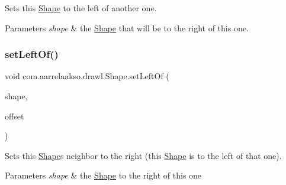 Sets this \hyperlink{classcom_1_1aarrelaakso_1_1drawl_1_1_shape}{Shape} to the left of another one. 


\begin{DoxyParams}{Parameters}
{\em shape} & the \hyperlink{classcom_1_1aarrelaakso_1_1drawl_1_1_shape}{Shape} that will be to the right of this one. \\
\hline
\end{DoxyParams}
\mbox{\label{classcom_1_1aarrelaakso_1_1drawl_1_1_shape_a185e0377ed1ba3ff4c8c630803f3bfc8}} 
\subsubsection{\texorpdfstring{set\+Left\+Of()}{setLeftOf()}\hspace{0.1cm}{\footnotesize\ttfamily [2/2]}}
{\footnotesize\ttfamily void com.\+aarrelaakso.\+drawl.\+Shape.\+set\+Left\+Of (\begin{DoxyParamCaption}\item[{@Not\+Null \hyperlink{classcom_1_1aarrelaakso_1_1drawl_1_1_shape}{Shape}}]{shape,  }\item[{@Not\+Null \hyperlink{classcom_1_1aarrelaakso_1_1drawl_1_1_measure}{Measure}}]{offset }\end{DoxyParamCaption})\hspace{0.3cm}{\ttfamily [inherited]}}



Sets this \hyperlink{classcom_1_1aarrelaakso_1_1drawl_1_1_shape}{Shape}\textquotesingle{}s neighbor to the right (this \hyperlink{classcom_1_1aarrelaakso_1_1drawl_1_1_shape}{Shape} is to the left of that one). 


\begin{DoxyParams}{Parameters}
{\em shape} & the \hyperlink{classcom_1_1aarrelaakso_1_1drawl_1_1_shape}{Shape} to the right of this one \\
\hline
\end{DoxyParams}
\mbox{\label{classcom_1_1aarrelaakso_1_1drawl_1_1_shape_ae658426065f0d35bd721cd94bc540209}} 
